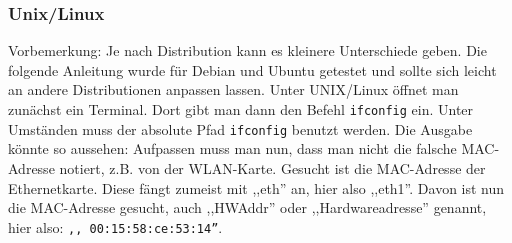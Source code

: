 \newpage
\subsubsection*{Unix/Linux}
\small{Vorbemerkung: Je nach Distribution kann es kleinere Unterschiede
geben. Die folgende Anleitung wurde für Debian und Ubuntu getestet und
sollte sich leicht an andere Distributionen anpassen lassen.} Unter
\glossar UNIX/Linux öffnet man zunächst ein Terminal. Dort gibt man
dann den Befehl \texttt{ifconfig} ein. Unter Umständen muss der
absolute Pfad \texttt{ifconfig} benutzt werden. Die Ausgabe könnte so
aussehen: %
Aufpassen muss man nun, dass man nicht die falsche MAC-Adresse
notiert, z.B. von der WLAN-Karte.
Gesucht ist die MAC-Adresse der Ethernetkarte. Diese fängt zumeist mit
,,eth'' an, hier also ,,eth1''.  Davon ist nun die MAC-Adresse
gesucht, auch ,,HWAddr'' oder ,,Hardwareadresse'' genannt, hier
also: \texttt{,, 00:15:58:ce:53:14''}. 

